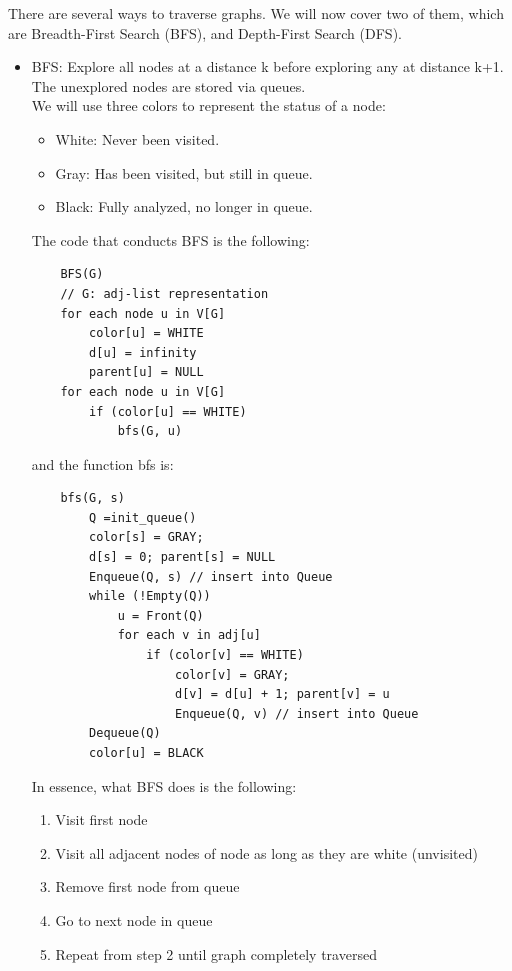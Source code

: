 \documentclass[nobib]{tufte-handout}
\begin{document}
There are several ways to traverse graphs. We will now cover two of them, which are Breadth-First Search (BFS), and Depth-First Search (DFS).\\
\begin{itemize}
    \item BFS: Explore all nodes at a distance k before exploring any at distance k+1.\\
          The unexplored nodes are stored via queues.\\ We will use three colors to
          represent the status of a node:\\
          \begin{itemize}
              \item White: Never been visited.
              \item Gray: Has been visited, but still in queue.
              \item Black: Fully analyzed, no longer in queue.
          \end{itemize}
          The code that conducts BFS is the following:
          \begin{lstlisting}
    BFS(G)
    // G: adj-list representation
    for each node u in V[G]
        color[u] = WHITE
        d[u] = infinity
        parent[u] = NULL
    for each node u in V[G]
        if (color[u] == WHITE)
            bfs(G, u)
    \end{lstlisting}
          and the function bfs is:
          \begin{lstlisting}
    bfs(G, s)
        Q =init_queue()
        color[s] = GRAY;
        d[s] = 0; parent[s] = NULL
        Enqueue(Q, s) // insert into Queue
        while (!Empty(Q))
            u = Front(Q)
            for each v in adj[u]
                if (color[v] == WHITE)
                    color[v] = GRAY;
                    d[v] = d[u] + 1; parent[v] = u
                    Enqueue(Q, v) // insert into Queue
        Dequeue(Q)
        color[u] = BLACK
    \end{lstlisting}
          In essence, what BFS does is the following:
          \begin{enumerate}
              \item Visit first node
              \item Visit all adjacent nodes of node as long as they are white (unvisited)
              \item Remove first node from queue
              \item Go to next node in queue
              \item Repeat from step 2 until graph completely traversed

\end{enumerate}
\end{itemize}
\end{document}
